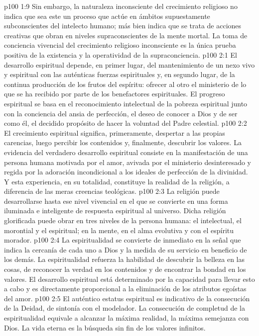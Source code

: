 \vs p100 1:9 Sin embargo, la naturaleza inconsciente del crecimiento religioso no indica que sea este un proceso que actúe en ámbitos supuestamente subconscientes del intelecto humano; más bien indica que se trata de acciones creativas que obran en niveles supraconscientes de la mente mortal. La toma de conciencia vivencial del crecimiento religioso inconsciente es la única prueba positiva de la existencia y la operatividad de la supraconciencia.
\vs p100 2:1 El desarrollo espiritual depende, en primer lugar, del mantenimiento de un nexo vivo y espiritual con las auténticas fuerzas espirituales y, en segundo lugar, de la continua producción de los frutos del espíritu: ofrecer al otro el ministerio de lo que se ha recibido por parte de los benefactores espirituales. El progreso espiritual se basa en el reconocimiento intelectual de la pobreza espiritual junto con la conciencia del ansia de perfección, el deseo de conocer a Dios y de ser como él, el decidido propósito de hacer la voluntad del Padre celestial.
\vs p100 2:2 El crecimiento espiritual significa, primeramente, despertar a las propias carencias, luego percibir los contenidos y, finalmente, descubrir los valores. La evidencia del verdadero desarrollo espiritual consiste en la manifestación de una persona humana motivada por el amor, avivada por el ministerio desinteresado y regida por la adoración incondicional a los ideales de perfección de la divinidad. Y esta experiencia, en su totalidad, constituye la realidad de la religión, a diferencia de las meras creencias teológicas.
\vs p100 2:3 La religión puede desarrollarse hasta ese nivel vivencial en el que se convierte en una forma iluminada e inteligente de respuesta espiritual al universo. Dicha religión glorificada puede obrar en tres niveles de la persona humana: el intelectual, el morontial y el espiritual; en la mente, en el alma evolutiva y con el espíritu morador.
\vs p100 2:4 \pc La espiritualidad se convierte de inmediato en la señal que indica la cercanía de cada uno a Dios y la medida de su servicio en beneficio de los demás. La espiritualidad refuerza la habilidad de descubrir la belleza en las cosas, de reconocer la verdad en los contenidos y de encontrar la bondad en los valores. El desarrollo espiritual está determinado por la capacidad para llevar esto a cabo y es directamente proporcional a la eliminación de los atributos egoístas del amor.
\vs p100 2:5 El auténtico estatus espiritual es indicativo de la consecución de la Deidad, de sintonía con el modelador. La consecución de completud de la espiritualidad equivale a alcanzar la máxima realidad, la máxima semejanza con Dios. La vida eterna es la búsqueda sin fin de los valores infinitos.

